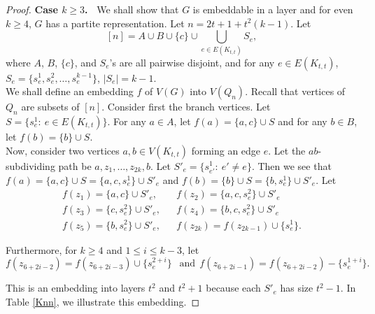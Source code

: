 \documentclass[11pt, a4paper]{article}
\begin{document}
\begin{proof}
\noindent 
{\bf Case $k\geq 3$.~ } We shall show that  $G$ is embeddable in a layer and for even $k\ge 4$, $G$ has a partite representation.
 Let $n= 2t+1+ t^2(k-1)$.  
Let $$[n] =A \cup B  \cup  \{c\} \cup \bigcup_{e\in E(K_{t,t})} S_e,$$
where $A$, $B$, $\{c\}$,  and $S_e$'s are all pairwise disjoint,  and for any $e\in E(K_{t,t})$,   $S_e=\{s_e^1, s_e^2, \ldots, s_e^{k-1}\}$, $|S_e|=k-1$.\\

We shall define an embedding $f$ of $V(G)$ into $V(Q_n)$. 
Recall that vertices of $Q_n$  are subsets of $[n]$.   Consider first the branch vertices. Let $S= \{s_e^1: ~ e\in E(K_{t,t})\}$.  For any $a\in A$, let $f(a) = \{a,c \}\cup S$ and  for  any $b\in B$, let $f(b) = \{b\}\cup S$. \\


 
 Now, consider two vertices $a, b\in V(K_{t,t})$ forming an edge $e$. 
 Let the $ab$-subdividing path be $a, z_1, \ldots, z_{2k}, b $.  
 Let $S'_e= \{s_{e'}^1: ~ e'\neq e\}$. 
 Then we see that $f(a) =\{a,c \}\cup S= \{a, c,  s_e^1 \} \cup S'_e$ and $f(b) =\{b\}\cup S= \{b, s_e^1\}\cup S'_e$. 
 Let 
 \begin{eqnarray*}
  f(z_1) = \{a, c \} \cup S'_e,&& f(z_2) = \{a, c,  s_e^2 \} \cup S'_e\\
  f(z_3) = \{  c, s_e^2\} \cup S'_e,&& f(z_4) = \{b, c, s_e^2\} \cup S'_e \\
  f(z_5) = \{b, s_e^2 \} \cup  S'_e, && f(z_{2k}) = f(z_{2k-1})\cup \{s_e^1\}.
 \end{eqnarray*}
 
 Furthermore, for $k\geq 4$ and $ 1\leq i \leq k-3$, let 
 $$f(z_{6+2i-2} ) = f(z_{6+2i-3}) \cup \{s_e^{2+i}\}~~ \mbox{ and}   ~~f(z_{6+2i-1} ) = f(z_{6+2i-2}) -\{s_e^{1+i}\}.$$

This is an embedding into layers $t^2$ and $t^2+1$ because each $S'_e$ has size $t^2-1$.
In Table \ref{Knn}, we illustrate this embedding.
  


\end{proof}
\end{document}
